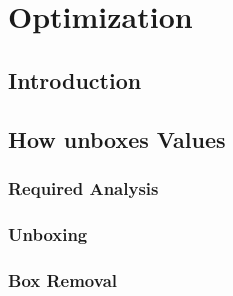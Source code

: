 \chapter{Optimization}

\section{Introduction}

\section{How \rift unboxes Values}
\subsection{Required Analysis}
\subsection{Unboxing}
\subsection{Box Removal}
